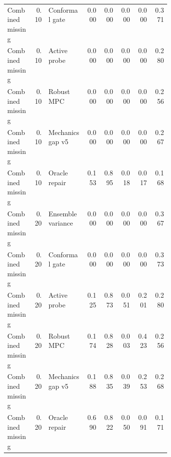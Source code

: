 \documentclass{article}
\begin{document}
\begin{center}
\begin{longtable}{p{0.16\linewidth}rp{0.23\linewidth}rrrrr}
Combined missing & 0.10 & Conformal gate & 0.000 & 0.000 & 0.000 & 0.000 & 0.371\\
Combined missing & 0.10 & Active probe & 0.000 & 0.000 & 0.000 & 0.000 & 0.280\\
Combined missing & 0.10 & Robust MPC & 0.000 & 0.000 & 0.000 & 0.000 & 0.256\\
Combined missing & 0.10 & Mechanics gap v5 & 0.000 & 0.000 & 0.000 & 0.000 & 0.267\\
Combined missing & 0.10 & Oracle repair & 0.153 & 0.895 & 0.018 & 0.017 & 0.168\\
Combined missing & 0.20 & Ensemble variance & 0.000 & 0.000 & 0.000 & 0.000 & 0.367\\
Combined missing & 0.20 & Conformal gate & 0.000 & 0.000 & 0.000 & 0.000 & 0.373\\
Combined missing & 0.20 & Active probe & 0.125 & 0.873 & 0.051 & 0.201 & 0.280\\
Combined missing & 0.20 & Robust MPC & 0.174 & 0.828 & 0.003 & 0.423 & 0.256\\
Combined missing & 0.20 & Mechanics gap v5 & 0.188 & 0.835 & 0.039 & 0.253 & 0.268\\
Combined missing & 0.20 & Oracle repair & 0.690 & 0.822 & 0.050 & 0.091 & 0.171\\
\bottomrule
\end{longtable}
\normalsize
\end{center}
\end{document}
